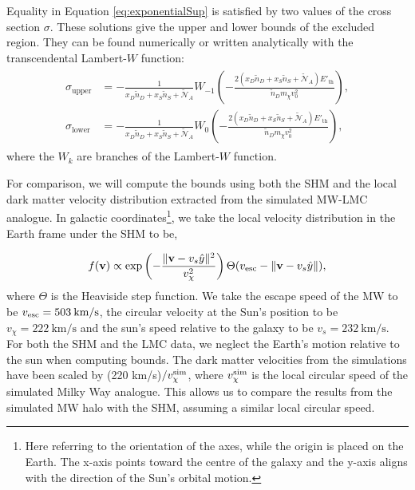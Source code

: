 \documentclass[12pt]{article}
\begin{document}
Equality in  Equation \ref{eq:exponentialSup} is satisfied by two values of the cross section $\sigma$. These solutions give the upper and lower bounds of the excluded region. They can be found numerically or written analytically with the transcendental Lambert-$W$ function:
\begin{align}\label{eq:bounds}
\begin{split}   
    \sigma_{\mathrm{upper}}&=-\frac{1}{x_D\tilde{n}_D+x_S\tilde{n}_S+\tilde{\mathcal{N}}_A}W_{-1}\left(-\frac{2(x_D\tilde{n}_D+x_S\tilde{n}_S + \tilde{\mathcal{N}}_A)E'_{\mathrm{th}} }{\tilde{n}_Dm_\chi v_0^2} \right),\\
        \sigma_{\mathrm{lower}}&=-\frac{1}{x_D\tilde{n}_D+x_S\tilde{n}_S+\tilde{\mathcal{N}}_A}W_{0}\left(-\frac{2(x_D\tilde{n}_D+x_S\tilde{n}_S+\tilde{\mathcal{N}}_A )E'_{\mathrm{th}} }{\tilde{n}_Dm_\chi v_0^2} \right),
\end{split}
\end{align}
where the $W_k$ are branches of the Lambert-$W$ function. 

For comparison, we will compute the bounds using both the SHM and the local dark matter velocity distribution extracted from the simulated MW-LMC analogue. In galactic coordinates\footnote{Here referring to the orientation of the axes, while the origin is placed on the Earth. The x-axis points toward the centre of the galaxy and the y-axis aligns with the direction of the Sun's orbital motion.}, we take the local velocity distribution in the Earth frame  under the SHM to be,

\begin{equation}\label{eq:shm}
    f(\mathbf{v}) \propto \exp\left(-\frac{\|\mathbf{v}-v_s\hat{y}\|^2}{v_\chi^2}\right)\Theta(v_{\rm esc}-\|\mathbf{v}-v_s\hat{y}\|),
\end{equation}
where $\Theta$ is the Heaviside step function. We take the escape speed of the MW to be $v_{\rm esc} = 503\: \text{km/s}$\cite{Deason2019}, the circular velocity at the Sun's position to be $v_\chi=222 \: \text{km/s}$\cite{Eilers_2019dmspeed} and the sun's speed relative to the galaxy to be $v_s=232 \:\text{km/s}$\cite{Springel:2009aa}. For both the SHM and the LMC data, we neglect the Earth's motion relative to the sun when computing bounds. The dark matter velocities from the simulations have been scaled by (220 km/s)$/v_{\chi}^{\rm sim}$, where $v_{\chi}^{\rm sim}$ is the local circular speed of the simulated Milky Way analogue. This allows us to compare the results from the simulated MW halo with the SHM, assuming a similar local circular speed.
\end{document}
